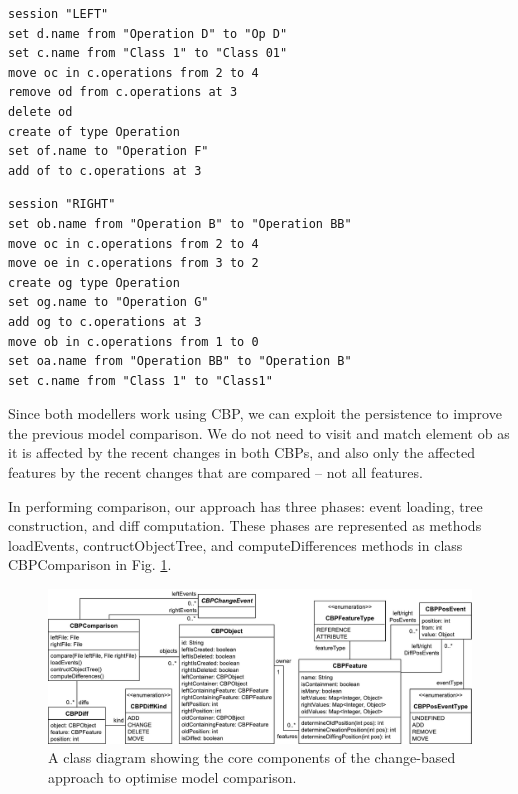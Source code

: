 \documentclass{llncs}
\begin{document}
\begin{minipage}[t]{0.49\linewidth}    
\begin{lstlisting}[firstnumber=19,style=eol,caption={The CBP of the model in Fig. \ref{fig:left} (left version).},label=lst:leftcbp]
session "LEFT"
set d.name from "Operation D" to "Op D"
set c.name from "Class 1" to "Class 01"
move oc in c.operations from 2 to 4
remove od from c.operations at 3
delete od
create of type Operation
set of.name to "Operation F"
add of to c.operations at 3
\end{lstlisting}
\end{minipage}
\hfill
\begin{minipage}[t]{0.49\linewidth}
\begin{lstlisting}[firstnumber=19,style=eol,caption={The CBP of the model in Fig. \ref{fig:right} (right version).},label=lst:rightcbp]
session "RIGHT"
set ob.name from "Operation B" to "Operation BB"
move oc in c.operations from 2 to 4
move oe in c.operations from 3 to 2
create og type Operation
set og.name to "Operation G" 
add og to c.operations at 3
move ob in c.operations from 1 to 0
set oa.name from "Operation BB" to "Operation B"
set c.name from "Class 1" to "Class1"
\end{lstlisting}
\end{minipage}

Since both modellers work using CBP, we can exploit the persistence to improve the previous model comparison. We do not need to visit and match element \textsf{ob} as it is affected by the recent changes in both CBPs, and also only the affected features by the recent changes that are compared -- not all features. 

In performing comparison, our approach has three phases: event loading, tree construction, and diff computation. These phases are represented as methods \textsf{loadEvents}, \textsf{contructObjectTree}, and \textsf{computeDifferences} methods in class \textsf{CBPComparison} in Fig. \ref{fig:approach_class_diagram}. 

\begin{figure}
    \includegraphics[width=\linewidth]{images/TreeClassDiagram}
    \caption{A class diagram showing the core components of the change-based approach to optimise model comparison.}
    \label{fig:approach_class_diagram}
\end{figure}
\end{document}
